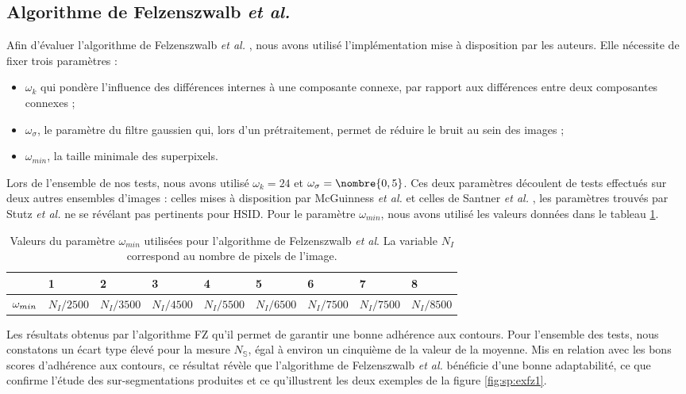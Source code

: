  \subsection{Algorithme de Felzenszwalb \textit{et al.}}
 
Afin d'évaluer l'algorithme de Felzenszwalb \textit{et al.} \cite{felzenszwalb2004efficient}, nous avons utilisé l'implémentation mise à disposition par les auteurs. Elle nécessite de fixer trois paramètres : 
 \begin{itemize}
 \item  $\omega_{k}$ qui pondère l'influence des différences internes à une composante connexe, par rapport aux différences entre deux composantes connexes ;
 \item $\omega_{\sigma}$, le paramètre du filtre gaussien qui, lors d'un prétraitement, permet de réduire le bruit au sein des images ;
 \item $\omega_{min}$, la taille minimale des superpixels. 
 \end{itemize}
 
 Lors de l'ensemble de nos tests, nous avons utilisé $\omega_{k} = 24$ et $\omega_{\sigma}=\nombre{0,5}$. Ces deux paramètres découlent de tests effectués sur deux autres ensembles d'images : celles mises à disposition par McGuinness \textit{et al.} \cite{mcguinness2010comparative} et celles de Santner \textit{et al.} \cite{santner2010interactive}, les paramètres trouvés par Stutz \textit{et al.} ne se révélant pas pertinents pour HSID. Pour le paramètre $\omega_{min}$, nous avons utilisé les valeurs données dans le tableau \ref{tab:sp:paramFZ}. 

\begin{table}[htb]
 \caption{Valeurs du paramètre $\omega_{min}$ utilisées pour l'algorithme de Felzenszwalb \textit{et al}. La variable $N_{I}$ correspond au nombre de pixels de l'image. }
\centering
\begin{tabular}{| l| l| l| l| l| l| l| l|  l|}
\hline
\cellcolor{gris}{Test} & 1 & 2 & 3 & 4 & 5 & 6&7 &8\\
\hline
$\cellcolor{gris}{\omega_{min}}$ & $ N_{I}/2500$ &  $ N_{I}/3500$  & $ N_{I}/4500$  & $ N_{I}/5500$  & $ N_{I}/6500$  & $N_{I}/7500$ &  $ N_{I}/7500$ & $ N_{I}/8500$ \\
\hline
\end{tabular}
\label{tab:sp:paramFZ}
\end{table}

Les résultats obtenus par l'algorithme FZ  qu'il permet de garantir une bonne adhérence aux contours. Pour l'ensemble des tests, nous constatons un écart type élevé pour la mesure $N_{\mathbb{S}}$, égal à environ un cinquième de la valeur de la moyenne. Mis en relation avec les bons scores d'adhérence aux contours, ce résultat révèle que l'algorithme de Felzenszwalb \textit{et al.} bénéficie d'une bonne adaptabilité, ce que confirme l'étude des sur-segmentations produites et ce qu'illustrent les deux exemples de la figure \ref{fig:sp:exfz1}.
 
